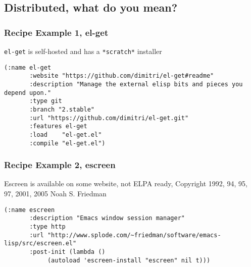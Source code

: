 \documentclass{beamer}
\begin{document}
\subsection{Distributed, what do you mean?}


\begin{frame}[fragile]
  \frametitle{Recipe Example 1, el-get}

  \texttt{el-get} is self-hosted and has a \texttt{*scratch*} installer

  \begin{verbatim}
(:name el-get
       :website "https://github.com/dimitri/el-get#readme"
       :description "Manage the external elisp bits and pieces you depend upon."
       :type git
       :branch "2.stable"
       :url "https://github.com/dimitri/el-get.git"
       :features el-get
       :load    "el-get.el"
       :compile "el-get.el")
  \end{verbatim}
\end{frame}

\begin{frame}[fragile]
  \frametitle{Recipe Example 2, escreen}

  Escreen is available on some website, not ELPA ready, Copyright 1992, 94,
  95, 97, 2001, 2005 Noah S. Friedman

  \begin{verbatim}
(:name escreen
       :description "Emacs window session manager"
       :type http
       :url "http://www.splode.com/~friedman/software/emacs-lisp/src/escreen.el"
       :post-init (lambda ()
		    (autoload 'escreen-install "escreen" nil t)))
  \end{verbatim}
\end{frame}
\end{document}
